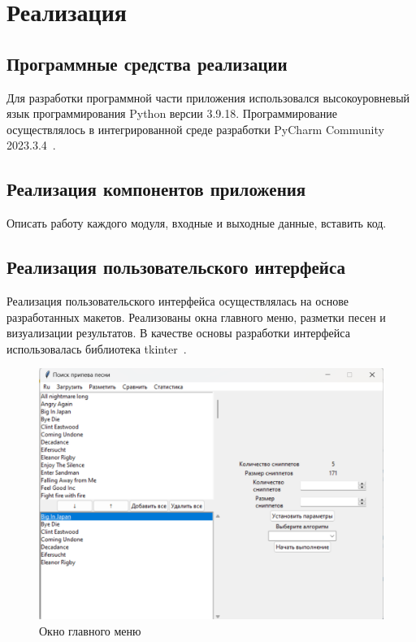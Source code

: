 \lstset{language=C, frame=L, basicstyle=\footnotesize,%
	keywordstyle=\bfseries, showstringspaces=false, xleftmargin=\parindent, numbers=none, numberstyle=\tiny, stepnumber=2, numbersep=5pt}
\newpage
\section{Реализация}
\label{sec:Design}
\subsection{Программные средства реализации}
Для разработки программной части приложения использовался высокоуровневый язык программирования Python версии 3.9.18. Программирование осуществлялось в интегрированной среде разработки PyCharm Community 2023.3.4~\cite{pycharm}.
\vspace{2em}
\subsection{Реализация компонентов приложения}
Описать работу каждого модуля, входные и выходные данные, вставить код.


\vspace{2em}
\subsection{Реализация пользовательского интерфейса}
Реализация пользовательского интерфейса осуществлялась на основе разработанных макетов. Реализованы окна главного меню, разметки песен и визуализации результатов. В качестве основы разработки интерфейса использовалась библиотека tkinter~\cite{tkinter}.

\begin{figure}
    \centering
    \includegraphics[width=1\linewidth]{pictures/Главный_скрин.png}
    \caption{Окно главного меню}
    \label{fig:Главный_скрин}
\end{figure}

